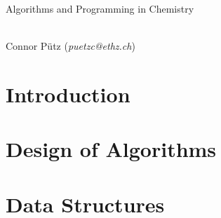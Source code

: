 \documentclass[a4paper,11pt]{scrartcl}
\begin{document}
\thispagestyle{empty}

\begin{center}
\begin{LARGE}\sectfont
Algorithms and Programming in Chemistry
\end{LARGE}\\\vspace{0.5cm}
Connor Pütz (\textit{puetzc@ethz.ch})
\\\vspace{1cm}
\end{center}

\tableofcontents

\newpage\section{Introduction}

\newpage\section{Design of Algorithms}

\newpage\section{Data Structures}







\end{document}
